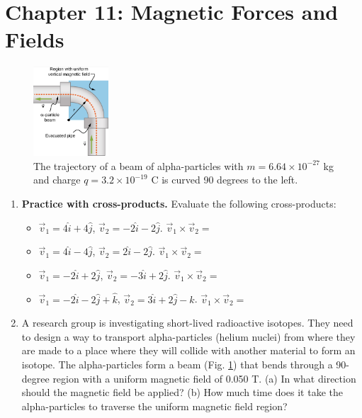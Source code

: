 \documentclass[10pt]{article}
\begin{document}
\clearpage

\section{Chapter 11: Magnetic Forces and Fields}

\begin{figure}[ht]
\centering
\includegraphics[width=0.25\textwidth]{pipe1.png}
\caption{\label{fig:pipe1} The trajectory of a beam of alpha-particles with $m = 6.64 \times 10^{-27}$ kg and charge $q = 3.2 \times 10^{-19}$ C is curved 90 degrees to the left.}
\end{figure}


\begin{enumerate}
\item \textbf{Practice with cross-products.}  Evaluate the following cross-products:
\begin{itemize}
\item $\vec{v}_1 = 4\hat{i}+4\hat{j}$, $\vec{v}_2 = -2\hat{i}-2\hat{j}$.  $\vec{v}_1 \times \vec{v}_2 = $
\item $\vec{v}_1 = 4\hat{i}-4\hat{j}$, $\vec{v}_2 = 2\hat{i}-2\hat{j}$.  $\vec{v}_1 \times \vec{v}_2 = $
\item $\vec{v}_1 = -2\hat{i}+2\hat{j}$, $\vec{v}_2 = -3\hat{i}+2\hat{j}$.  $\vec{v}_1 \times \vec{v}_2 = $
\item $\vec{v}_1 = -2\hat{i}-2\hat{j}+\hat{k}$, $\vec{v}_2 = 3\hat{i}+2\hat{j}-\hat{k}$.  $\vec{v}_1 \times \vec{v}_2 = $
\end{itemize} \vspace{3cm}
\item A research group is investigating short-lived radioactive isotopes. They need to design a way to transport alpha-particles (helium nuclei) from where they are made to a place where they will collide with another material to form an isotope. The alpha-particles form a beam (Fig. \ref{fig:pipe1}) that bends through a 90-degree region with a uniform magnetic field of 0.050 T. (a) In what direction should the magnetic field be applied? (b) How much time does it take the alpha-particles to traverse the uniform magnetic field region?
\end{enumerate}
\end{document}
